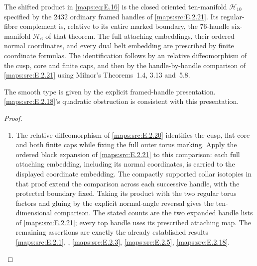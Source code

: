 \begin{proposition}\hypertarget{tag-02MO}{}\label{maps:src:E.2.4}


The shifted product in \eqref{maps:eq:E.16} is the closed oriented ten-manifold
$\mathcal H_{10}$ specified by the $2432$ ordinary framed handles
of \ref{maps:src:E.2.21}. Its regular-fibre complement is, relative to its entire
marked boundary, the $76$-handle six-manifold $\mathcal H_6$ of
that theorem. The full attaching embeddings, their ordered normal
coordinates, and every dual belt embedding are prescribed by
finite coordinate formulas. The identification follows by an
relative diffeomorphism of the cusp, core and finite caps,
and then by the handle-by-handle comparison of \ref{maps:src:E.2.21} using
Milnor's Theorems~1.4, 3.13 and~5.8. 

The smooth type is given by the explicit framed-handle presentation. \ref{maps:src:E.2.18}'s quadratic obstruction is consistent
with this presentation. 


\end{proposition}
\begin{proof}
\begin{enumerate}[label={$\langle1\rangle$\arabic*.},leftmargin=*]
\item The relative diffeomorphism of \cref{maps:src:E.2.20} identifies the cusp, flat core and both finite caps while fixing the full outer torus marking. Apply the ordered block expansion of \cref{maps:src:E.2.21} to this comparison: each full attaching embedding, including its normal coordinates, is carried to the displayed coordinate embedding. The compactly supported collar isotopies in that proof extend the comparison across each successive handle, with the protected boundary fixed. Taking its product with the two regular torus factors and gluing by the explicit normal-angle reversal gives the ten-dimensional comparison. The stated counts are the two expanded handle lists of \cref{maps:src:E.2.21}; every top handle uses its prescribed attaching map. The remaining assertions are exactly the already established results \cref{maps:src:E.2.1}, , \cref{maps:src:E.2.3}, \cref{maps:src:E.2.5}, \cref{maps:src:E.2.18}.
\end{enumerate}
\end{proof}



